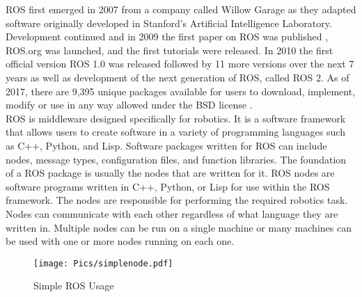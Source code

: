 ROS first emerged in 2007 from a company called Willow Garage as they adapted software originally developed in Stanford's Artificial Intelligence Laboratory. Development continued and in 2009 the first paper on ROS was published \cite{rosfirst}, ROS.org was launched, and the first tutorials were released. In 2010 the first official version ROS 1.0 was released followed by 11 more versions over the next 7 years as well as development of the next generation of ROS, called ROS 2. As of 2017, there are 9,395 unique packages available for users to download, implement, modify or use in any way allowed under the BSD license \cite{bsd}.\\

ROS is middleware designed specifically for robotics. It is a software framework that allows users to create software in a variety of programming languages such as C++, Python, and Lisp. Software packages written for ROS can include nodes, message types, configuration files, and function libraries. The foundation of a ROS package is usually the nodes that are written for it. ROS nodes are software programs written in C++, Python, or Lisp for use within the ROS framework. The nodes are responsible for performing the required robotics task. Nodes can communicate with each other regardless of what language they are written in. Multiple nodes can be run on a single machine or many machines can be used with one or more nodes running on each one.\\

\begin{figure}[h!]
    \centering
    \texttt{[image: Pics/simplenode.pdf]}
    \caption{Simple ROS Usage}
    \label{fig:rosmessage}
\end{figure}

